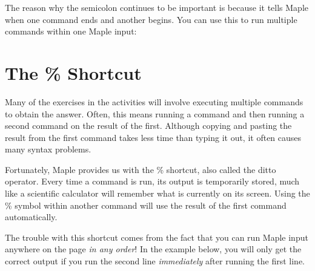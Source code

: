 
The reason why the semicolon continues to be important is because it tells Maple when one command ends and another begins. You can use this to run multiple commands within one Maple input:

\begin{maplegroup}
\begin{mapleinput}
\end{mapleinput}
\mapleresult
\begin{maplelatex}
\end{maplelatex}
\begin{maplelatex}
\end{maplelatex}
\end{maplegroup}

\section{The \% Shortcut}
\label{sec:ditto_operator}

Many of the exercises in the activities will involve executing multiple commands to obtain the answer. Often, this means running a command and then running a second command on the result of the first. Although copying and pasting the result from the first command takes less time than typing it out, it often causes many syntax problems.

Fortunately, Maple provides us with the \% shortcut, also called the ditto operator. Every time a command is run, its output is temporarily stored, much like a scientific calculator will remember what is currently on its screen. Using the \% symbol within another command will use the result of the first command automatically. 

The trouble with this shortcut comes from the fact that you can run Maple input anywhere on the page \textit{in any order}! In the example below, you will only get the correct output if you run the second line \textit{immediately} after running the first line.

